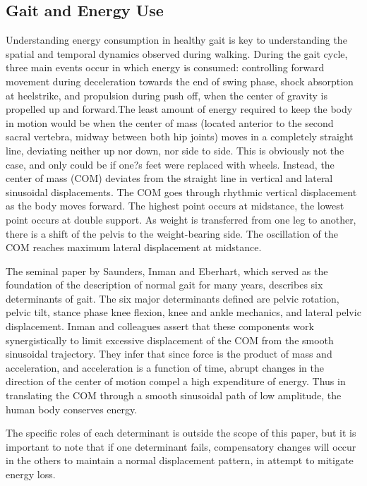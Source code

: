 \documentclass[11pt, oneside]{report}   	%
\begin{document}
\subsection{Gait and Energy Use}

Understanding energy consumption in healthy gait is key to understanding the spatial and temporal dynamics observed during walking. During the gait cycle, three main events occur in which energy is consumed: controlling forward movement during deceleration towards the end of swing phase, shock absorption at heelstrike, and propulsion during push off, when the center of gravity is propelled up and forward\cite{Inman1981}.The least amount of energy required to keep the body in motion would be when the center of mass (located anterior to the second sacral vertebra, midway between both hip joints) moves in a completely straight line, deviating neither up nor down, nor side to side\cite{Inman1981}. This is obviously not the case, and only could be if one?s feet were replaced with wheels. Instead, the center of mass (COM) deviates from the straight line in vertical and lateral sinusoidal displacements\cite{Inman1981}. The COM goes through rhythmic vertical displacement as the body moves forward. The highest point occurs at midstance, the lowest point occurs at double support. As weight is transferred from one leg to another, there is a shift of the pelvis to the weight-bearing side. The oscillation of the COM reaches maximum lateral displacement at midstance\cite{Inman1981}.

The seminal paper by Saunders, Inman and Eberhart, which served as the foundation of the description of normal gait for many years, describes six determinants of gait\cite{SaundersJBInmanVT1953}. The six major determinants defined are pelvic rotation, pelvic tilt, stance phase knee flexion, knee and ankle mechanics, and lateral pelvic displacement\cite{SaundersJBInmanVT1953}. Inman and colleagues assert that these components work synergistically to limit excessive displacement of the COM from the smooth sinusoidal trajectory\cite{SaundersJBInmanVT1953}. They infer that since force is the product of mass and acceleration, and acceleration is a function of time, abrupt changes in the direction of the center of motion compel a high expenditure of energy\cite{SaundersJBInmanVT1953}. Thus in translating the COM through a smooth sinusoidal path of low amplitude, the human body conserves energy\cite{SaundersJBInmanVT1953}.

The specific roles of each determinant is outside the scope of this paper, but it is important to note that if one determinant fails, compensatory changes will occur in the others to maintain a normal displacement pattern, in attempt to mitigate energy loss\cite{SaundersJBInmanVT1953}. 
\end{document}
